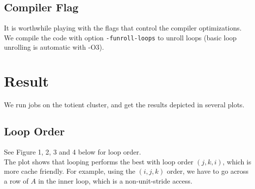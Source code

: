 \documentclass[12pt]{article}
\numberwithin{equation}{section}
\begin{document}
\subsection{Compiler Flag}

It is worthwhile playing with the flags that control the compiler optimizations.
\\
We compile the code with option \texttt{-funroll-loops} to unroll loops (basic loop unrolling is automatic with -O3).

\section{Result}

We run jobs on the totient cluster, and get the results depicted in several plots.  

\subsection{Loop Order}

See Figure 1, 2, 3 and 4 below for loop order.
\\
The plot shows that looping performs the best with loop order $(j, k, i)$, which is more cache friendly. For example, using the $(i,j,k)$ order, we have to go across a row of $A$ in the inner loop, which is a non-unit-stride access.
\end{document}
